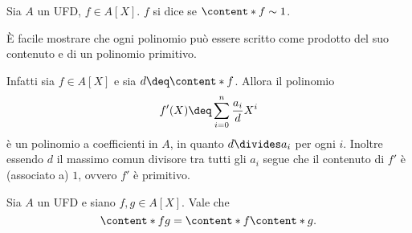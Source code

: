 \begin{definition}
    Sia $A$ un UFD, $f \in A[X]$. $f$ si dice  se $\content*{f} \sim 1$.
\end{definition}

È facile mostrare che ogni polinomio può essere scritto come prodotto del suo contenuto e di un polinomio primitivo. 

Infatti sia $f \in A[X]$ e sia $d \deq \content*{f}$. Allora il polinomio \[
    f'(X) \deq \sum_{i=0}^n \frac{a_i}{d}X^i    
\] è un polinomio a coefficienti in $A$, in quanto $d \divides a_i$ per ogni $i$. Inoltre essendo $d$ il massimo comun divisore tra tutti gli $a_i$ segue che il contenuto di $f'$ è (associato a) $1$, ovvero $f'$ è primitivo.

\begin{theorem}
    Sia $A$ un UFD e siano $f, g \in A[X]$. Vale che \[
        \content*{fg} = \content*{f}\content*{g}.    
    \]
\end{theorem}
